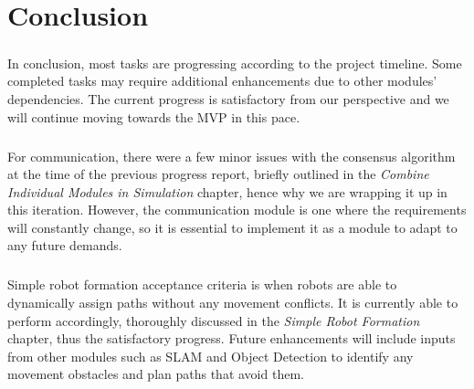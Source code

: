 \chapter{Conclusion}

\paragraph*{}
In conclusion, most tasks are progressing according to the project timeline. Some completed tasks may require additional enhancements due to other modules' dependencies. The current progress is satisfactory from our perspective and we will continue moving towards the MVP in this pace.

\paragraph*{}
For communication, there were a few minor issues with the consensus algorithm at the time of the previous progress report, briefly outlined in the \textit{Combine Individual Modules in Simulation} chapter, hence why we are wrapping it up in this iteration. However, the communication module is one where the requirements will constantly change, so it is essential to implement it as a module to adapt to any future demands.

\paragraph*{}
Simple robot formation acceptance criteria is when robots are able to dynamically assign paths without any movement conflicts. It is currently able to perform accordingly, thoroughly discussed in the \textit{Simple Robot Formation} chapter, thus the satisfactory progress. Future enhancements will include inputs from other modules such as SLAM and Object Detection to identify any movement obstacles and plan paths that avoid them.

